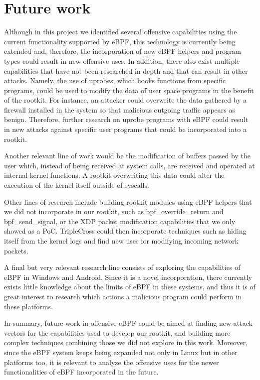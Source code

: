 \section{Future work}
Although in this project we identified several offensive capabilities
using the current functionality supported by eBPF, this technology is
currently being extended and, therefore, the incorporation of new eBPF
helpers and program types could result in new offensive uses.
%
In addition, there also exist multiple capabilities that have not been
researched in depth and that can result in other attacks. Namely, the use
of uprobes, which hooks functions from specific programs, could be used to
modify the data of user space programs in the benefit of the rootkit. For
instance, an attacker could overwrite the data gathered by a firewall
installed in the system so that malicious outgoing traffic appears as
benign. Therefore, further research on uprobe programs with eBPF could
result in new attacks against specific user programs that could be
incorporated into a rootkit.

Another relevant line of work would be the modification of buffers passed
by the user which, instead of being received at system calls, are received
and operated at internal kernel functions. A rootkit overwriting this data
could alter the execution of the kernel itself outside of syscalls. 

Other lines of research include building rootkit modules using eBPF helpers
that we did not incorporate in our rootkit, such as bpf\_override\_return
and  bpf\_send\_signal, or the XDP packet modification capabilities that we
only showed as a PoC. TripleCross could then incorporate techniques such as
hiding itself from the kernel logs and find new uses for modifying incoming
network packets.

A final but very relevant research line consists of exploring the
capabilities of eBPF in Windows and Android. Since it is a novel
incorporation, there currently exists little knowledge about the limits of
eBPF in these systems, and thus it is of great interest to research which
actions a malicious program could perform in these platforms.

In summary, future work in offensive eBPF could be aimed at finding new
attack vectors for the capabilities used to develop our rootkit, and
building more complex techniques combining those we did not explore in this
work. Moreover, since the eBPF system keeps being expanded not only in
Linux but in other platforms too, it is relevant to analyze the offensive
uses for the newer functionalities of eBPF incorporated in the future.
